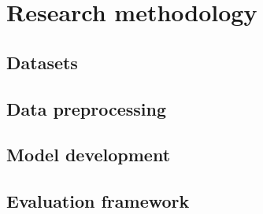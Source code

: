 \documentclass[pdftex,10pt,a4paper,oneside]{article}
\numberwithin{equation}{section}
\begin{document}
\newpage



\newpage



\newpage

\section{Research methodology}\label{sec:3-research-methodology}


\subsection*{Datasets}






\newpage



\newpage

\subsection*{Data preprocessing}

\subsection*{Model development}




\subsection*{Evaluation framework}
\end{document}
